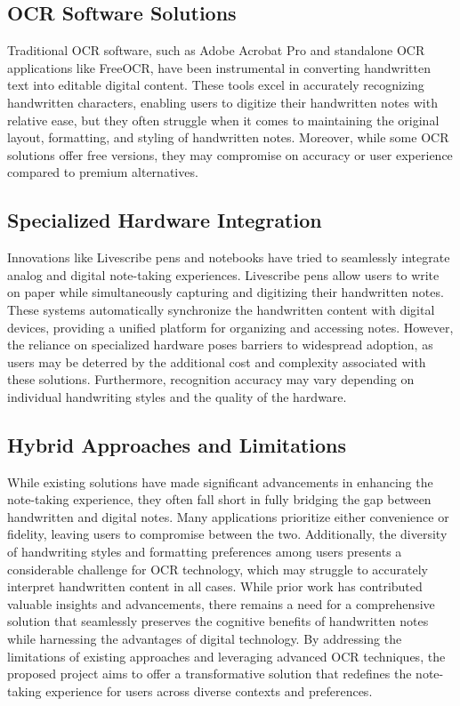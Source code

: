 \documentclass[10pt,twocolumn]{article}
\begin{document}
\subsection{OCR Software Solutions}
Traditional OCR software, such as Adobe Acrobat Pro and standalone OCR applications like FreeOCR, have been instrumental in converting handwritten text into editable digital content. These tools excel in accurately recognizing handwritten characters, enabling users to digitize their handwritten notes with relative ease, but they often struggle when it comes to maintaining the original layout, formatting, and styling of handwritten notes. Moreover, while some OCR solutions offer free versions, they may compromise on accuracy or user experience compared to premium alternatives.

\subsection{Specialized Hardware Integration}
Innovations like Livescribe pens and notebooks have tried to seamlessly integrate analog and digital note-taking experiences. Livescribe pens allow users to write on paper while simultaneously capturing and digitizing their handwritten notes. These systems automatically synchronize the handwritten content with digital devices, providing a unified platform for organizing and accessing notes. However, the reliance on specialized hardware poses barriers to widespread adoption, as users may be deterred by the additional cost and complexity associated with these solutions. Furthermore, recognition accuracy may vary depending on individual handwriting styles and the quality of the hardware.

\subsection{Hybrid Approaches and Limitations}
While existing solutions have made significant advancements in enhancing the note-taking experience, they often fall short in fully bridging the gap between handwritten and digital notes. Many applications prioritize either convenience or fidelity, leaving users to compromise between the two. Additionally, the diversity of handwriting styles and formatting preferences among users presents a considerable challenge for OCR technology, which may struggle to accurately interpret handwritten content in all cases. While prior work has contributed valuable insights and advancements, there remains a need for a comprehensive solution that seamlessly preserves the cognitive benefits of handwritten notes while harnessing the advantages of digital technology. By addressing the limitations of existing approaches and leveraging advanced OCR techniques, the proposed project aims to offer a transformative solution that redefines the note-taking experience for users across diverse contexts and preferences.
\end{document}
